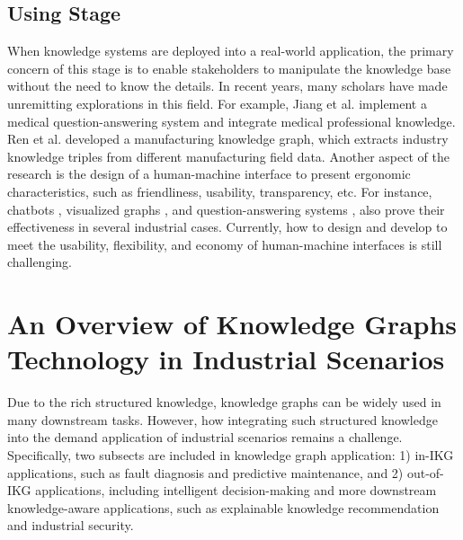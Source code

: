 \documentclass[11pt]{article}
\begin{document}
\subsection{Using Stage}
\par{When knowledge systems are deployed into a real-world application, the primary concern of this stage is to enable stakeholders to manipulate the knowledge base without the need to know the details.
In recent years, many scholars have made unremitting explorations in this field.
For example, Jiang et al. \cite{bib23} implement a medical question-answering system and integrate medical professional knowledge.
Ren et al. \cite{bib24} developed a manufacturing knowledge graph, which extracts industry knowledge triples from different manufacturing field data.
Another aspect of the research is the design of a human-machine interface to present ergonomic characteristics, such as friendliness, usability, transparency, etc.
For instance, chatbots \cite{bib25}, visualized graphs \cite{bib26}, and question-answering systems \cite{bib27}, also prove their effectiveness in several industrial cases.
Currently, how to design and develop to meet the usability, flexibility, and economy of human-machine interfaces is still challenging.}


\section{An Overview of Knowledge Graphs Technology in Industrial Scenarios}\label{sec4}
\par{Due to the rich structured knowledge, knowledge graphs can be widely used in many downstream tasks.
However, how integrating such structured knowledge into the demand application of industrial scenarios remains a challenge.
Specifically, two subsects are included in knowledge graph application: 1) in-IKG applications, such as fault diagnosis and predictive maintenance, and 2) out-of-IKG applications, including intelligent decision-making and more downstream knowledge-aware applications, such as explainable knowledge recommendation and industrial security.}
\end{document}
